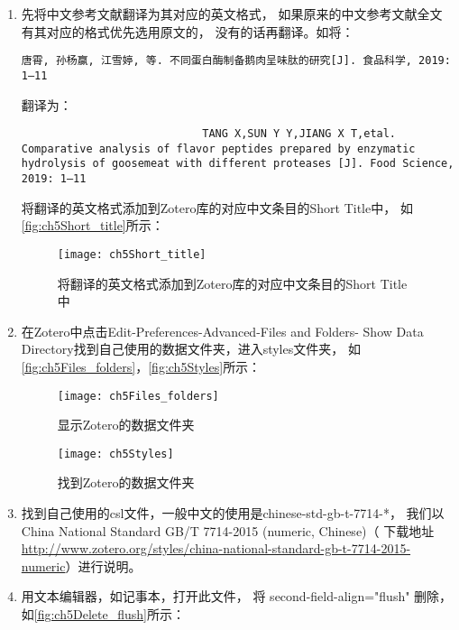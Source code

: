 \documentclass[cn,11pt,chinese]{elegantbook}
\begin{document}
				\begin{enumerate}
					\item 先将中文参考文献翻译为其对应的英文格式，
						如果原来的中文参考文献全文有其对应的格式优先选用原文的，
						没有的话再翻译。如将：
						\begin{lstlisting}[language=VBScript]
						唐霄, 孙杨赢, 江雪婷, 等. 不同蛋白酶制备鹅肉呈味肽的研究[J]. 食品科学, 2019: 1–11
						\end{lstlisting}
						翻译为：
						\begin{lstlisting}
							TANG X,SUN Y Y,JIANG X T,etal. Comparative analysis of flavor peptides prepared by enzymatic hydrolysis of goosemeat with different proteases [J]. Food Science, 2019: 1–11
						\end{lstlisting}
						将翻译的英文格式添加到Zotero库的对应中文条目的Short Title中，
						如\autoref{fig:ch5Short_title}所示：
						\begin{figure}[ht]
							\centering
							\texttt{[image: ch5Short\_title]}
							\caption{将翻译的英文格式添加到Zotero库的对应中文条目的Short Title中}
							\label{fig:ch5Short_title}
						\end{figure}
						\item 在Zotero中点击Edit-Preferences-Advanced-Files and Folders-
							Show Data Directory找到自己使用的数据文件夹，进入styles文件夹，
							如\autoref{fig:ch5Files_folders}，\autoref{fig:ch5Styles}所示：
							\begin{figure}[ht]
								\centering
								\texttt{[image: ch5Files\_folders]}
								\caption{显示Zotero的数据文件夹}
								\label{fig:ch5Files_folders}
							\end{figure}
							\begin{figure}[ht]
								\centering
								\texttt{[image: ch5Styles]}
								\caption{找到Zotero的数据文件夹}
								\label{fig:ch5Styles}
							\end{figure}
						\item 找到自己使用的csl文件，一般中文的使用是chinese-std-gb-t-7714-*，
							我们以China National Standard GB/T 7714-2015 
							(numeric, Chinese)（
							下载地址\url{http://www.zotero.org/styles/china-national-standard-gb-t-7714-2015-numeric}）进行说明。
						\item 	用文本编辑器，如记事本，打开此文件，
							将 second-field-align="flush" 删除，如\autoref{fig:ch5Delete_flush}所示：

\end{enumerate}
\end{document}
